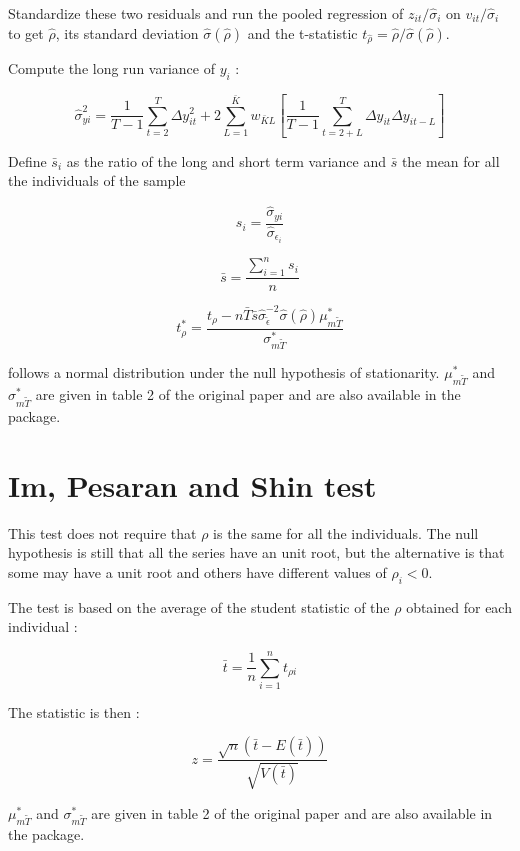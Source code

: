 \documentclass{article}
\begin{document}
Standardize these two residuals and run the pooled regression of
$z_{it}/\hat{\sigma}_i$ on $v_{it}/\hat{\sigma}_i$ to get
$\hat{\rho}$, its standard deviation $\hat{\sigma}({\hat{\rho}})$ and
the t-statistic $t_{\hat{\rho}}=\hat{\rho}/\hat{\sigma}({\hat{\rho}})$.

Compute the long run variance of $y_i$ :

$$
\hat{\sigma}_{yi}^2 = \frac{1}{T-1}\sum_{t=2}^T \Delta y_{it}^2 + 2
\sum_{L=1}^{\bar{K}}w_{\bar{K}L}\left[\frac{1}{T-1}\sum_{t=2+L}^T
  \Delta y_{it} \Delta y_{it-L}\right]
$$

Define $\bar{s}_i$ as the ratio of the long and short term variance
and $\bar{s}$ the mean for all the individuals of the sample

$$
s_i = \frac{\hat{\sigma}_{yi}}{\hat{\sigma}_{\epsilon_i}}
$$

$$
\bar{s} = \frac{\sum_{i=1}^n s_i}{n}
$$


$$
t^*_{\rho}=\frac{t_{\rho}- n \bar{T} \bar{s} \hat{\sigma}_{\tilde{\epsilon}}^{-2}
\hat{\sigma}({\hat{\rho}}) \mu^*_{m\tilde{T}}}{\sigma^*_{m\tilde{T}}}
$$

follows a normal distribution under the null hypothesis of
stationarity. $\mu^*_{m\tilde{T}}$ and $\sigma^*_{m\tilde{T}}$ are
given in table 2 of the original paper and are also available in the
package.

\section{Im, Pesaran and Shin test}

This test does not require that $\rho$ is the same for all the
individuals. The null hypothesis is still that all the series have an
unit root, but the alternative is that some may have a unit root and
others have different values of $\rho_i <0$.

The test is based on the average of the student statistic of the
$\rho$ obtained for each individual :

$$
\bar{t}=\frac{1}{n}\sum_{i=1}^n t_{\rho i}
$$

The statistic is then :

$$
z = \frac{\sqrt{n}\left(\bar{t}- E(\bar{t})\right)}{\sqrt{V(\bar{t})}}
$$

$\mu^*_{m\tilde{T}}$ and $\sigma^*_{m\tilde{T}}$ are
given in table 2 of the original paper and are also available in the
package.
\end{document}
